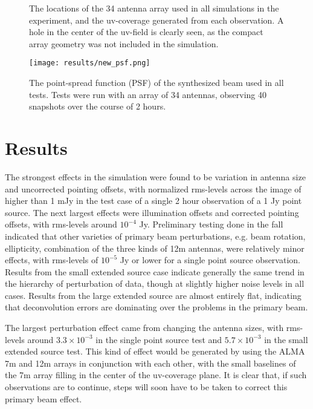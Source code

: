 \documentclass[11pt]{article}
\begin{document}
\begin{figure}
    \centering
    \quad
    \caption{
        The locations of the 34 antenna array used in all simulations in the
        experiment, and the uv-coverage generated from each observation. A
        hole in the center of the uv-field is clearly seen, as the compact 
        array geometry was not included in the simulation.
    }
    \label{fig:params}
\end{figure}

\begin{figure}
    \centering
    \texttt{[image: results/new\_psf.png]}
    \caption{
        The point-spread function (PSF) of the synthesized beam used in all 
        tests.  Tests were run with an array of 34 antennas, observing 40 
        snapshots over the course of 2 hours.
    }
    \label{fig:psf}
\end{figure}

\section{Results}

The strongest effects in the simulation were found to be
variation in antenna size and uncorrected pointing offsets, with normalized 
rms-levels across the image of higher than 1 mJy in the test case of a single 2 
hour observation of a 1 Jy point source.  The next largest effects were 
illumination offsets and corrected pointing offsets, with rms-levels around 
$10^{-4}$ Jy.  Preliminary testing done in the fall indicated that other 
varieties of primary beam perturbations, e.g. beam rotation, ellipticity, 
combination of the three kinds of 12m antennas, were relatively minor effects, 
with rms-levels of $10^{-5}$ Jy or lower for a single point source observation.  
Results from the small extended source case indicate generally the same trend 
in the hierarchy of perturbation of data, though at slightly higher noise 
levels in all cases.  Results from the large extended source are almost 
entirely flat, indicating that deconvolution errors are dominating over the 
problems in the primary beam.

The largest perturbation effect came from changing the antenna sizes, with 
rms-levels around $ 3.3 \times 10^{-3}$ in the single point source test and 
$5.7 \times 10^{-3}$ in the small extended source test. This kind of effect 
would be generated by using the ALMA 7m and 12m arrays in conjunction with each 
other, with the small baselines of the 7m array filling in the center of the 
uv-coverage plane.  It is clear that, if such observations are to continue, 
steps will soon have to be taken to correct this primary beam effect.
\end{document}
